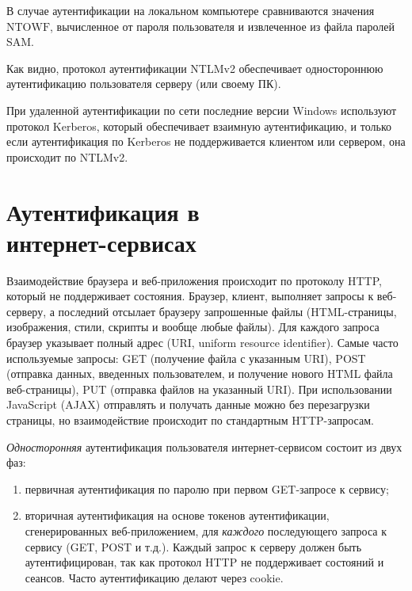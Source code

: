\documentclass[10pt,a4paper]{book}
\begin{document}
В случае аутентификации на локальном компьютере сравниваются значения $\textrm{NTOWF}$, вычисленное от пароля пользователя и извлеченное из файла паролей SAM.

Как видно, протокол аутентификации NTLMv2 обеспечивает одностороннюю аутентификацию пользователя серверу (или своему ПК).

При удаленной аутентификации по сети последние версии Windows используют протокол Kerberos, который обеспечивает взаимную аутентификацию, и только если аутентификация по Kerberos не поддерживается клиентом или сервером, она происходит по NTLMv2.


\section[Аутентификация в интернет-сервисах]{Аутентификация в \protect\\ интернет-сервисах}

Взаимодействие браузера и веб-приложения происходит по протоколу HTTP, который не поддерживает состояния. Браузер, клиент, выполняет запросы к веб-серверу, а последний отсылает браузеру запрошенные файлы (HTML-страницы, изображения, стили, скрипты и вообще любые файлы). Для каждого запроса браузер указывает полный адрес (URI, uniform resource identifier). Самые часто используемые запросы: GET (получение файла с указанным URI), POST (отправка данных, введенных пользователем, и получение нового HTML файла веб-страницы), PUT (отправка файлов на указанный URI). При использовании JavaScript (AJAX) отправлять и получать данные можно без перезагрузки страницы, но взаимодействие происходит по стандартным HTTP-запросам.

\emph{Односторонняя} аутентификация пользователя интернет-сервисом состоит из двух фаз:
\begin{enumerate}
    \item первичная аутентификация по паролю при первом GET-запросе к сервису;
    \item вторичная аутентификация на основе токенов аутентификации, сгенерированных веб-приложением, для \emph{каждого} последующего запроса к сервису (GET, POST и т.д.). Каждый запрос к серверу должен быть аутентифицирован, так как протокол HTTP не поддерживает состояний и сеансов. Часто аутентификацию делают через cookie.
\end{enumerate}
\end{document}
